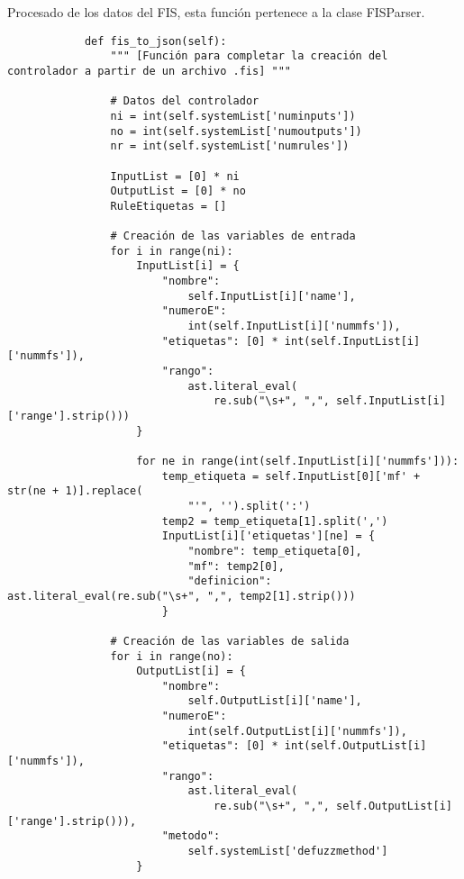     \begin{longlisting}
        \caption[Procesado de los datos del FIS]{Procesado de los datos del FIS, esta función pertenece a la clase FISParser.}
        \label{code:anexoF2}				
        \begin{verbatim}
            def fis_to_json(self):
                """ [Función para completar la creación del controlador a partir de un archivo .fis] """

                # Datos del controlador
                ni = int(self.systemList['numinputs'])
                no = int(self.systemList['numoutputs'])
                nr = int(self.systemList['numrules'])

                InputList = [0] * ni
                OutputList = [0] * no
                RuleEtiquetas = []

                # Creación de las variables de entrada
                for i in range(ni):
                    InputList[i] = {
                        "nombre":
                            self.InputList[i]['name'],
                        "numeroE":
                            int(self.InputList[i]['nummfs']),
                        "etiquetas": [0] * int(self.InputList[i]['nummfs']),
                        "rango":
                            ast.literal_eval(
                                re.sub("\s+", ",", self.InputList[i]['range'].strip()))
                    }

                    for ne in range(int(self.InputList[i]['nummfs'])):
                        temp_etiqueta = self.InputList[0]['mf' + str(ne + 1)].replace(
                            "'", '').split(':')
                        temp2 = temp_etiqueta[1].split(',')
                        InputList[i]['etiquetas'][ne] = {
                            "nombre": temp_etiqueta[0],
                            "mf": temp2[0],
                            "definicion": ast.literal_eval(re.sub("\s+", ",", temp2[1].strip()))
                        }

                # Creación de las variables de salida
                for i in range(no):
                    OutputList[i] = {
                        "nombre":
                            self.OutputList[i]['name'],
                        "numeroE":
                            int(self.OutputList[i]['nummfs']),
                        "etiquetas": [0] * int(self.OutputList[i]['nummfs']),
                        "rango":
                            ast.literal_eval(
                                re.sub("\s+", ",", self.OutputList[i]['range'].strip())),
                        "metodo":
                            self.systemList['defuzzmethod']
                    }


\end{verbatim}
\end{longlisting}
